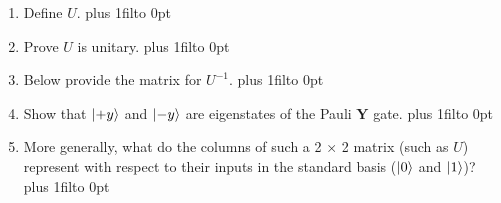 \documentclass[12pt]{article}
\def\DefaultSpace{1in}
\newcommand{\LeaveSpace}[1][\DefaultSpace]{%
\vskip #1 plus 1fil\relax\hbox to 0pt{\hss} %
}
\begin{document}
\begin{enumerate}[font=\bfseries]
        \begin{enumerate}
            \item Define $U$. \LeaveSpace[0.75in]
            \item Prove $U$ is unitary. \LeaveSpace[2.5in]
            \item Below provide the matrix for $U^{-1}$. \LeaveSpace{}
            \item Show that $\ket{+y}$ and $\ket{-y}$ are eigenstates of the Pauli $\mathbf{Y}$ gate. \LeaveSpace{}
            \item More generally, what do the columns of such a 2 × 2 matrix (such as $U$) represent with respect to their inputs in the standard basis ($\ket{0}$ and $\ket{1}$)? \LeaveSpace{}
        \end{enumerate}

\end{enumerate}
\end{document}
